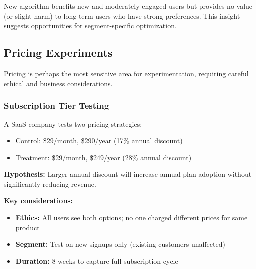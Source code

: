 New algorithm benefits new and moderately engaged users but provides no value (or slight harm) to long-term users who have strong preferences. This insight suggests opportunities for segment-specific optimization.

\subsection{Pricing Experiments}

Pricing is perhaps the most sensitive area for experimentation, requiring careful ethical and business considerations.

\subsubsection{Subscription Tier Testing}

A SaaS company tests two pricing strategies:
\begin{itemize}
    \item Control: \$29/month, \$290/year (17\% annual discount)
    \item Treatment: \$29/month, \$249/year (28\% annual discount)
\end{itemize}

\textbf{Hypothesis:} Larger annual discount will increase annual plan adoption without significantly reducing revenue.

\textbf{Key considerations:}
\begin{itemize}
    \item \textbf{Ethics:} All users see both options; no one charged different prices for same product
    \item \textbf{Segment:} Test on new signups only (existing customers unaffected)
    \item \textbf{Duration:} 8 weeks to capture full subscription cycle
\end{itemize}

